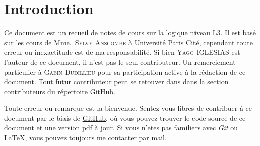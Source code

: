 \section{Introduction}

Ce document est un recueil de notes de cours sur la logique niveau L3. Il est
basé sur les cours de Mme.~\textsc{Sylvy Anscombe} à Université Paris Cité, cependant toute
erreur ou inexactitude est de ma responsabilité.
Si bien \textsc{Yago IGLESIAS} est l'auteur de ce document, il n'est pas
le seul contributeur. Un remerciement particulier à \textsc{Gabin Dudillieu} pour sa
participation active à la rédaction de ce document. Tout futur contributeur
peut se retouver dans dans la section contributeurs du répertoire
\href{https://github.com/Yag000/logique-notes/graphs/contributors}{GitHub}.
\vspace{0.5cm}

Toute erreur ou remarque est la bienvenue.
Sentez vous libres de contribuer à ce document par le biais de \href{https://github.com/Yag000/logique-notes}{GitHub},
où vous pouvez trouver le code source de ce document et une version pdf à jour.
Si vous n'etes pas familiers avec \textit{Git} ou \LaTeX , vous pouvez toujours me contacter
par \href{mailto: yago.iglesias.vazquez@gmail.com}{mail}.







